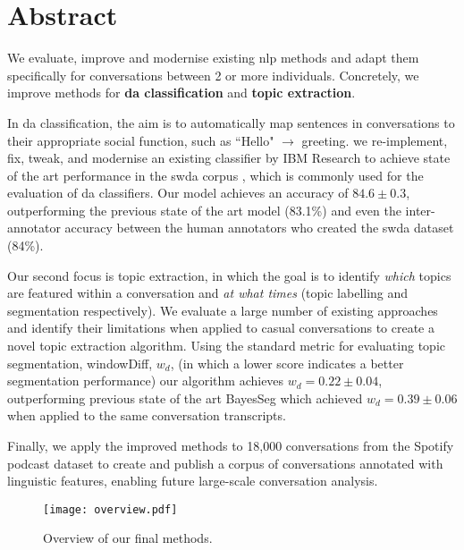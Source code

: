 \chapter*{Abstract}
\thispagestyle{empty}
We evaluate, improve and modernise existing \gls{nlp} methods and adapt them specifically for conversations between 2 or more individuals. Concretely, we improve methods for \textbf{\gls{da} classification} and \textbf{topic extraction}.

In \gls{da} classification, the aim is to automatically map sentences in conversations to their appropriate social function, such as ``Hello" $\rightarrow$ greeting. we re-implement, fix, tweak, and modernise an existing classifier by IBM Research\cite{kumar2017dialogue} to achieve state of the art performance in the \gls{swda} corpus \cite{swda}, which is commonly used for the evaluation of \gls{da} classifiers.
Our \gls{model} achieves an accuracy of $\mathbf{84.6 \pm 0.3}$, outperforming the previous state of the art \gls{model} (83.1\%)\cite{ravi2018self} and even the inter-annotator accuracy between the human annotators who created the \gls{swda} dataset\cite{swda} (84\%).

Our second focus is topic extraction, in which the goal is to identify \textit{which} topics are featured within a conversation and \textit{at what times} (topic labelling and segmentation respectively). We evaluate a large number of existing approaches and identify their limitations when applied to casual conversations to create a novel topic extraction algorithm.
Using the standard metric for evaluating topic segmentation, windowDiff, $w_d$, (in which a lower score indicates a better segmentation performance) our algorithm achieves $w_d = \mathbf{0.22 \pm 0.04}$, outperforming previous state of the art BayesSeg\cite{eisenstein2008bayesian} which achieved $w_d = 0.39 \pm 0.06$ when applied to the same conversation transcripts.

Finally, we apply the improved methods to 18,000 conversations from the Spotify podcast dataset\cite{clifton-2020100000} to create and publish a corpus of conversations annotated with linguistic features, enabling future large-scale conversation analysis.

\begin{figure}
    \centering
    \texttt{[image: overview.pdf]}
    \caption{Overview of our final methods.}
    \label{fig:overview}
\end{figure}
\glsresetall
\newpage
